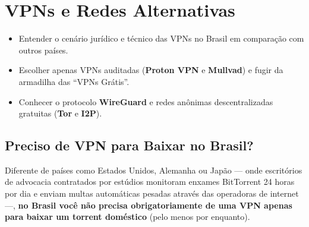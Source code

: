 \documentclass{pousadaguide}
\begin{document}

\chapter{VPNs e Redes Alternativas}

\begin{missao}
\begin{itemize}
  \item Entender o cenário jurídico e técnico das VPNs no Brasil em comparação com outros países.
  \item Escolher apenas VPNs auditadas (\textbf{Proton VPN} e \textbf{Mullvad}) e fugir da armadilha das ``VPNs Grátis''.
  \item Conhecer o protocolo \textbf{WireGuard} e redes anônimas descentralizadas gratuitas (\textbf{Tor} e \textbf{I2P}).
\end{itemize}
\end{missao}

\section{Preciso de VPN para Baixar no Brasil?}

Diferente de países como Estados Unidos, Alemanha ou Japão — onde escritórios de advocacia contratados por estúdios monitoram enxames BitTorrent 24 horas por dia e enviam multas automáticas pesadas através das operadoras de internet —, \textbf{no Brasil você não precisa obrigatoriamente de uma VPN apenas para baixar um torrent doméstico} (pelo menos por enquanto).
\end{document}
